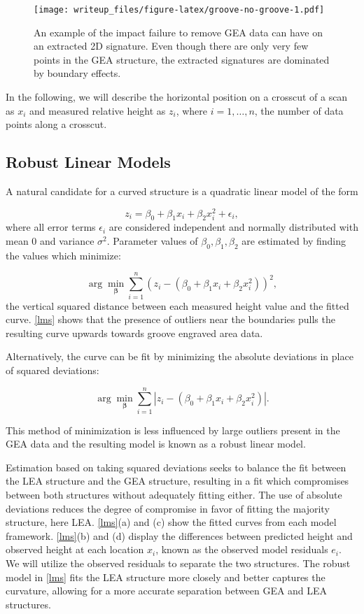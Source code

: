 \documentclass[12pt]{article}
\begin{document}
\begin{figure}
\centering
\texttt{[image: writeup\_files/figure-latex/groove-no-groove-1.pdf]}
\caption{\label{groove-no-groove}An example of the impact failure to
remove GEA data can have on an extracted 2D signature. Even though there
are only very few points in the GEA structure, the extracted signatures
are dominated by boundary effects.}
\end{figure}

In the following, we will describe the horizontal position on a crosscut
of a scan as \(x_i\) and measured relative height as \(z_i\), where
\(i = 1, \dots, n\), the number of data points along a crosscut.

\subsection{Robust Linear Models}

A natural candidate for a curved structure is a quadratic linear model
of the form

\[
z_i = \beta_0 + \beta_1x_i + \beta_2 x_i^2 + \epsilon_i,
\] where all error terms \(\epsilon_i\) are considered independent and
normally distributed with mean \(0\) and variance \(\sigma^2\).
Parameter values of \(\beta_0, \beta_1, \beta_2\) are estimated by
finding the values which minimize:

\[\arg\min_{\mathbf{\beta}} \sum_{i=1}^n \left(z_i - (\beta_0 + \beta_1x_i + \beta_2x_i^2)\right)^2,\]
the vertical squared distance between each measured height value and the
fitted curve. \autoref{lms} shows that the presence of outliers near the
boundaries pulls the resulting curve upwards towards groove engraved
area data.

Alternatively, the curve can be fit by minimizing the absolute
deviations in place of squared deviations:

\[\arg\min_{\mathbf{\beta}} \sum_{i=1}^n \left|z_i - (\beta_0 + \beta_1x_i + \beta_2x_i^2) \right|.\]

This method of minimization is less influenced by large outliers present
in the GEA data and the resulting model is known as a robust linear
model.

Estimation based on taking squared deviations seeks to balance the fit
between the LEA structure and the GEA structure, resulting in a fit
which compromises between both structures without adequately fitting
either. The use of absolute deviations reduces the degree of compromise
in favor of fitting the majority structure, here LEA. \autoref{lms}(a)
and (c) show the fitted curves from each model framework.
\autoref{lms}(b) and (d) display the differences between predicted
height and observed height at each location \(x_i\), known as the
observed model residuals \(e_i\). We will utilize the observed residuals
to separate the two structures. The robust model in \autoref{lms} fits
the LEA structure more closely and better captures the curvature,
allowing for a more accurate separation between GEA and LEA structures.
\end{document}
